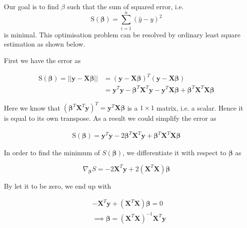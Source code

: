  \begin{mscproof}
 	 Our goal is to find $\beta$ such that the sum of squared error, i.e. $$\text{S}(\boldsymbol{\beta})=\sum_{i=1}^n(\hat{y}-y)^2$$ is minimal. This optimisation problem can be resolved by ordinary least square estimation as shown below.
 
 First we have the error as
 
 \begin{equation}
 \begin{split}
 \text{S}(\boldsymbol{\beta})=||\boldsymbol{y}-\boldsymbol{X} \boldsymbol{\beta}||& =(\boldsymbol{y}-\boldsymbol{X}\boldsymbol{\beta})^T(\boldsymbol{y}-\boldsymbol{X}\boldsymbol{\beta})\\
 	& =\boldsymbol{y}^T\boldsymbol{y}-\boldsymbol{\beta}^T\boldsymbol{X}^T\boldsymbol{y}-\boldsymbol{y}^T\boldsymbol{X}\boldsymbol{\beta}+\boldsymbol{\beta}^T\boldsymbol{X}^T\boldsymbol{X}\boldsymbol{\beta}
\end{split}
 \end{equation}
 
 Here we know that $(\boldsymbol{\beta}^T\boldsymbol{X}^T\boldsymbol{y})^T=\boldsymbol{y}^T\boldsymbol{X}\boldsymbol{\beta}$ is a $1\times 1$ matrix, i.e. a scalar. Hence it is equal to its own transpose. As a result we could simplify the error as
 
 \begin{equation}
 	\begin{split}
 		\text{S}(\boldsymbol{\beta})=\boldsymbol{y}^T\boldsymbol{y}-2\boldsymbol{\beta}^T\boldsymbol{X}^T\boldsymbol{y}+\boldsymbol{\beta}^T\boldsymbol{X}^T\boldsymbol{X}\boldsymbol{\beta}
 	\end{split}
 \end{equation}
 
 In order to find the minimum of $S(\boldsymbol{\beta})$, we differentiate it with respect to $\boldsymbol{\beta}$ as 
 
 \begin{equation}
 	\nabla_{\boldsymbol{\beta}}S=-2\boldsymbol{X}^T\boldsymbol{y}+2(\boldsymbol{X}^T\boldsymbol{X})\boldsymbol{\beta}
 \end{equation}
 
 By let it to be zero, we end up with 
 
 \begin{equation}
 \begin{split}
 	 &	-\boldsymbol{X}^T\boldsymbol{y}+(\boldsymbol{X}^T\boldsymbol{X})\boldsymbol{\beta}=0 \\
 	& \implies \boldsymbol{\beta}= (\boldsymbol{X}^T\boldsymbol{X})^{-1}\boldsymbol{X}^T\boldsymbol{y}
 \end{split}
 \end{equation}
 
 \end{mscproof}